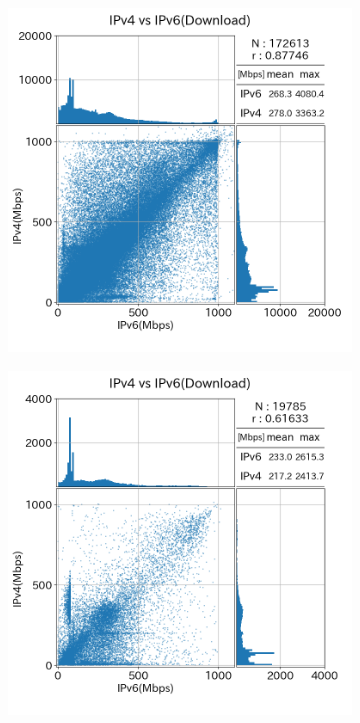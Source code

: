 \begin{figure}[htbp]
\begin{center}
\begin{subfigure}[b]{0.49\textwidth}
            \label{old_diffISP_dl}
        \end{subfigure}
        \caption{(1)のダウンロードのスループット}
        \label{fig:old_isp_dl}
    
        \begin{subfigure}[b]{0.49\textwidth}
            \centering
            \includegraphics[width=1.0\textwidth]{fig/new_sameISP_dl.png}
            \label{new_sameISP_dl}
        \end{subfigure}
        \begin{subfigure}[b]{0.49\textwidth}
            \centering
            \includegraphics[width=1.0\textwidth]{fig/new_diffISP_dl.png}

\end{subfigure}
\end{center}
\end{figure}

